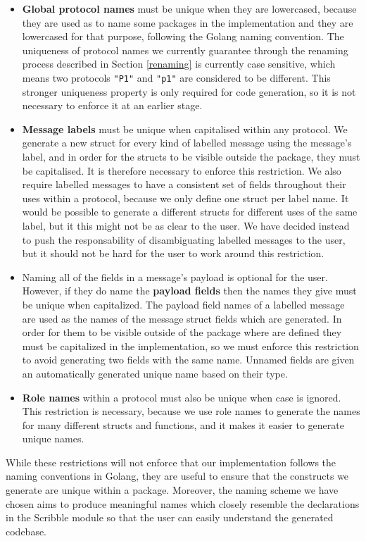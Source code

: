\documentclass[12pt,twoside]{report}
\begin{document}
\begin{itemize}
    \item \textbf{Global protocol names} must be unique when they are lowercased, because they are used as to name some packages in the implementation and they are lowercased for that purpose, following the Golang naming convention. The uniqueness of protocol names we currently guarantee through the renaming process described in Section \ref{renaming} is currently case sensitive, which means two protocols \texttt{"P1"} and \texttt{"p1"} are considered to be different. This stronger uniqueness property is only required for code generation, so it is not necessary to enforce it at an earlier stage.
    \item \textbf{Message labels} must be unique when capitalised within any protocol. We generate a new struct for every kind of labelled message using the message's label, and in order for the structs to be visible outside the package, they must be capitalised. It is therefore necessary to enforce this restriction. We also require labelled messages to have a consistent set of fields throughout their uses within a protocol, because we only define one struct per label name. It would be possible to generate a different structs for different uses of the same label, but it this might not be as clear to the user. We have decided instead to push the responsability of disambiguating labelled messages to the user, but it should not be hard for the user to work around this restriction.
    \item Naming all of the fields in a message's payload is optional for the user. However, if they do name the \textbf{payload fields} then the names they give must be unique when capitalized. The payload field names of a labelled message are used as the names of the message struct fields which are generated. In order for them to be visible outside of the package where are defined they must be capitalized in the implementation, so we must enforce this restriction to avoid generating two fields with the same name. Unnamed fields are given an automatically generated unique name based on their type.
    \item \textbf{Role names} within a protocol must also be unique when case is ignored. This restriction is necessary, because we use role names to generate the names for many different structs and functions, and it makes it easier to generate unique names.
\end{itemize}

While these restrictions will not enforce that our implementation follows the naming conventions in Golang, they are useful to ensure that the constructs we generate are unique within a package. Moreover, the naming scheme we have chosen aims to produce meaningful names which closely resemble the declarations in the Scribble module so that the user can easily understand the generated codebase.
\end{document}
